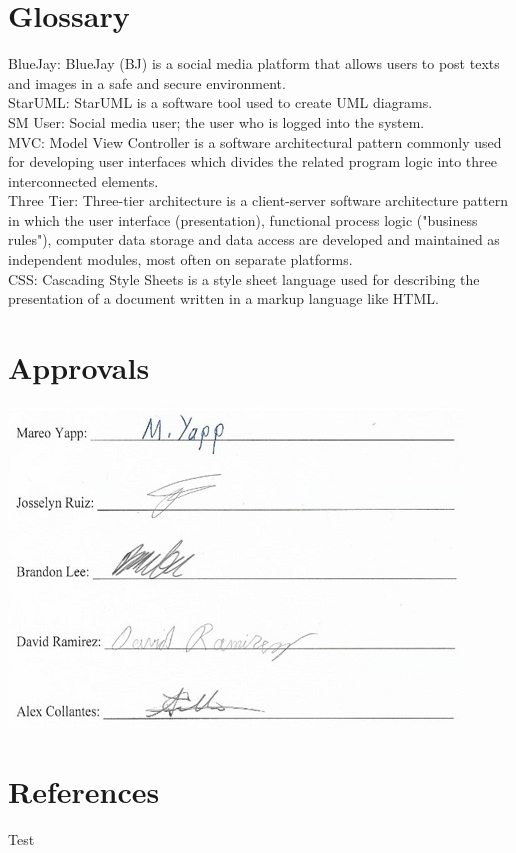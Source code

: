 \documentclass{report}
\begin{document}
\chapter{Glossary}
BlueJay: BlueJay (BJ) is a social media platform that allows users to post texts and images in a safe and secure environment.\\
StarUML: StarUML is a software tool used to create UML diagrams.\\
SM User: Social media user; the user who is logged into the system.\\
MVC: Model View Controller is a software architectural pattern commonly used for developing user interfaces which divides the related program logic into three interconnected elements.\\
Three Tier: Three-tier architecture is a client-server software architecture pattern in which the user interface (presentation), functional process logic ("business rules"), computer data storage and data access are developed and maintained as independent modules, most often on separate platforms.\\
CSS: Cascading Style Sheets is a style sheet language used for describing the presentation of a document written in a markup language like HTML.\\

\chapter{Approvals} 
\includegraphics{Signatures}
\newpage

\chapter{References}
Test
\appendix
\end{document}
